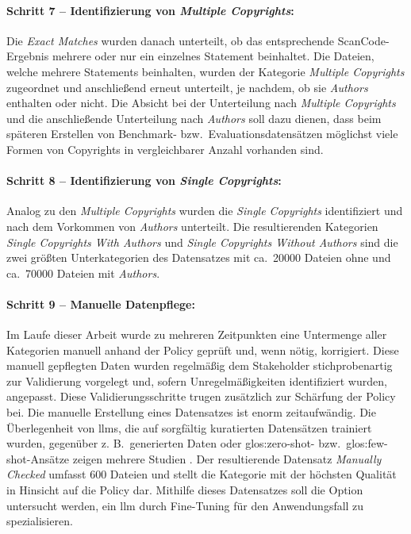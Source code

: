 \paragraph{Schritt 7 -- Identifizierung von \textit{Multiple Copyrights}:}
Die \textit{Exact Matches} wurden danach unterteilt, ob das entsprechende ScanCode-Ergebnis mehrere oder nur ein einzelnes Statement beinhaltet.
Die Dateien, welche mehrere Statements beinhalten, wurden der Kategorie \textit{Multiple Copyrights} zugeordnet und anschließend erneut unterteilt, je nachdem, ob sie \textit{Authors} enthalten oder nicht.
Die Absicht bei der Unterteilung nach \textit{Multiple Copyrights} und die anschließende Unterteilung nach \textit{Authors} soll dazu dienen, dass beim späteren Erstellen von Benchmark- bzw.\ Evaluationsdatensätzen möglichst viele Formen von Copyrights in vergleichbarer Anzahl vorhanden sind.

\paragraph{Schritt 8 -- Identifizierung von \textit{Single Copyrights}:}
Analog zu den \textit{Multiple Copyrights} wurden die \textit{Single Copyrights} identifiziert und nach dem Vorkommen von \textit{Authors} unterteilt.
Die resultierenden Kategorien \textit{Single Copyrights With Authors} und \textit{Single Copyrights Without Authors} sind die zwei größten Unterkategorien des Datensatzes mit ca.\ \num{20000} Dateien ohne und ca.\ \num{70000} Dateien mit \textit{Authors}.

\paragraph{Schritt 9 -- Manuelle Datenpflege:}
Im Laufe dieser Arbeit wurde zu mehreren Zeitpunkten eine Untermenge aller Kategorien manuell anhand der Policy geprüft und, wenn nötig, korrigiert.
Diese manuell gepflegten Daten wurden regelmäßig dem Stakeholder stichprobenartig zur Validierung vorgelegt und, sofern Unregelmäßigkeiten identifiziert wurden, angepasst.
Diese Validierungsschritte trugen zusätzlich zur Schärfung der Policy bei.
Die manuelle Erstellung eines Datensatzes ist enorm zeitaufwändig.
Die Überlegenheit von \glspl{llm}, die auf sorgfältig kuratierten Datensätzen trainiert wurden, gegenüber z. B.\ generierten Daten oder \gls{glos:zero-shot}- bzw.\ \gls{glos:few-shot}-Ansätze zeigen mehrere Studien \autocite{breton_empowering_2024} \autocite{villena_llmner_2024}.
Der resultierende Datensatz \textit{Manually Checked} umfasst \num{600} Dateien und stellt die Kategorie mit der höchsten Qualität in Hinsicht auf die Policy dar.
Mithilfe dieses Datensatzes soll die Option untersucht werden, ein \gls{llm} durch Fine-Tuning für den Anwendungsfall zu spezialisieren.


